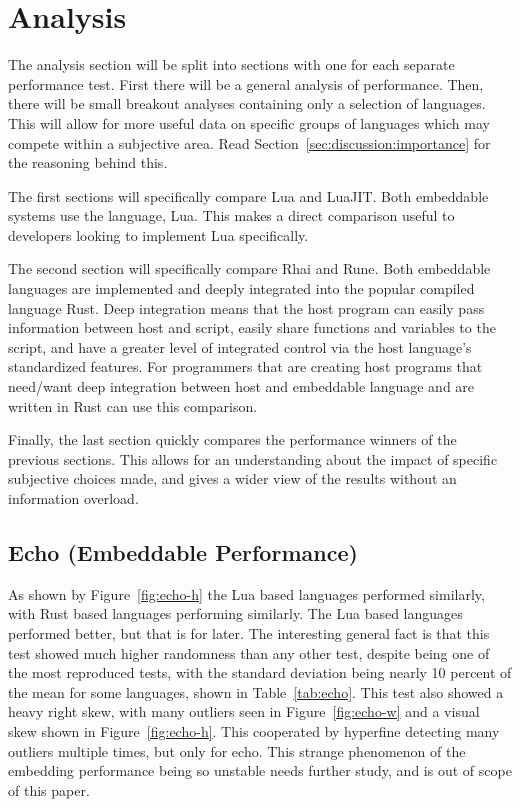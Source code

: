 \section{Analysis} \label{sec:analysis}
The analysis section will be split into sections with one for each separate performance test. First there will be a general analysis of performance. Then, there will be small breakout analyses containing only a selection of languages. This will allow for more useful data on specific groups of languages which may compete within a subjective area. Read Section~\ref{sec:discussion:importance} for the reasoning behind this.

The first sections will specifically compare Lua and LuaJIT. Both embeddable systems use the language, Lua. This makes a direct comparison useful to developers looking to implement Lua specifically.

The second section will specifically compare Rhai and Rune. Both embeddable languages are implemented and deeply integrated into the popular compiled language Rust. Deep integration means that the host program can easily pass information between host and script, easily share functions and variables to the script, and have a greater level of integrated control via the host language's standardized features. For programmers that are creating host programs that need/want deep integration between host and embeddable language and are written in Rust can use this comparison.

Finally, the last section quickly compares the performance winners of the previous sections. This allows for an understanding about the impact of specific subjective choices made, and gives a wider view of the results without an information overload.

\subsection{Echo (Embeddable Performance)} \label{sec:analysis:echo}
As shown by Figure~\ref{fig:echo-h} the Lua based languages performed similarly, with Rust based languages performing similarly. The Lua based languages performed better, but that is for later. The interesting general fact is that this test showed much higher randomness than any other test, despite being one of the most reproduced tests, with the standard deviation being nearly 10 percent of the mean for some languages, shown in Table~\ref{tab:echo}. This test also showed a heavy right skew, with many outliers seen in Figure~\ref{fig:echo-w} and a visual skew shown in Figure~\ref{fig:echo-h}. This cooperated by hyperfine detecting many outliers multiple times, but only for echo. This strange phenomenon of the embedding performance being so unstable needs further study, and is out of scope of this paper.

